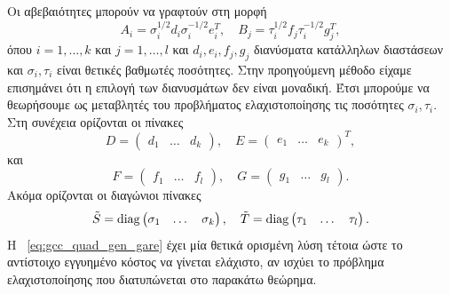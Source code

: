 Οι αβεβαιότητες μπορούν να γραφτούν στη μορφή
\[
    A_i = \sigma_i^{1/2}d_i\sigma_i^{-1/2}e_i^T, \quad
    B_j = \tau_i^{1/2}f_j\tau_i^{-1/2}g_j^T,
\]
όπου \( i = 1, \dots, k \) και \( j = 1, \dots, l \) και \(d_i, e_i, f_j, g_j \)
διανύσματα κατάλληλων διαστάσεων και \( \sigma_i, \tau_i \) είναι θετικές
βαθμωτές ποσότητες. Στην προηγούμενη μέθοδο είχαμε επισημάνει ότι η επιλογή των
διανυσμάτων δεν είναι μοναδική. Έτσι μπορούμε να θεωρήσουμε ως μεταβλητές του
προβλήματος ελαχιστοποίησης τις ποσότητες \( \sigma_i, \tau_i \). Στη συνέχεια
ορίζονται οι πίνακες
\[
    D = \begin{pmatrix} d_1 & \dots & d_k\end{pmatrix}, \quad
    E = \begin{pmatrix} e_1 & \dots & e_k\end{pmatrix}^T,
\]
και
\[
    F = \begin{pmatrix} f_1 & \dots & f_l\end{pmatrix}, \quad
    G = \begin{pmatrix} g_1 & \dots & g_l\end{pmatrix}.
\]
Ακόμα ορίζονται οι διαγώνιοι πίνακες
\[
    \tilde{S} = \operatorname{diag}\begin{pmatrix} \sigma_1 & \dots & \sigma_k\end{pmatrix}, \quad
    \tilde{T} = \operatorname{diag}\begin{pmatrix} \tau_1 & \dots & \tau_l\end{pmatrix}.
\]
Η ~\eqref{eq:gcc_quad_gen_gare} έχει μία θετικά ορισμένη λύση
τέτοια ώστε το αντίστοιχο εγγυημένο κόστος να γίνεται ελάχιστο, αν
ισχύει το πρόβλημα ελαχιστοποίησης που διατυπώνεται στο παρακάτω θεώρημα.

